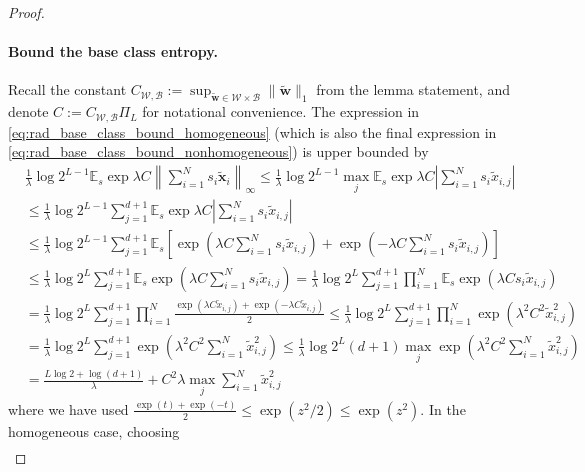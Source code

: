 \documentclass{article}
\def\vw{{\bm{w}}}
\def\vx{{\bm{x}}}
\def\cB{{\mathcal{B}}}
\def\cW{{\mathcal{W}}}
\def\bE{{\mathbb{E}}}
\begin{document}
\begin{appendices}
\begin{proof}
    \paragraph{Bound the base class entropy.} Recall the constant $C_{\cW, \cB} := \sup_{\widetilde{\vw} \in \cW \times \cB} \| \widetilde{\vw} \|_1$ from the lemma statement, and denote $C := C_{\cW,\cB}  \Pi_L$ for notational convenience. The expression in \eqref{eq:rad_base_class_bound_homogeneous} (which is also the final expression in \eqref{eq:rad_base_class_bound_nonhomogeneous}) is upper bounded by
    \begin{align}
        &\frac{1}{\lambda} \log 2^{L-1} \bE_s \exp \lambda C \left\| \sum_{i=1}^N s_i \widetilde{\vx}_i \right\|_\infty \leq \frac{1}{\lambda} \log 2^{L-1} \max_j \bE_s \exp \lambda C \left| \sum_{i=1}^N s_i \widetilde{x}_{i,j} \right| \\
        &\leq \frac{1}{\lambda} \log 2^{L-1} \sum_{j=1}^{d+1} \bE_s \exp \lambda C \left| \sum_{i=1}^N s_i \widetilde{x}_{i,j} \right| \\
        &\leq \frac{1}{\lambda} \log 2^{L-1} \sum_{j=1}^{d+1}  \bE_s \left[  \exp \left( \lambda C  \sum_{i=1}^N s_i \widetilde{x}_{i,j} \right) +   \exp \left( -\lambda C  \sum_{i=1}^N s_i \widetilde{x}_{i,j} \right) \right]   \\
        &\leq \frac{1}{\lambda} \log 2^L \sum_{j=1}^{d+1}  \bE_s  \exp \left( \lambda C  \sum_{i=1}^N s_i \widetilde{x}_{i,j} \right) = \frac{1}{\lambda} \log 2^L \sum_{j=1}^{d+1} \prod_{i=1}^N  \bE_s  \exp \left( \lambda C   s_i \widetilde{x}_{i,j} \right) \\
        &= \frac{1}{\lambda} \log 2^L \sum_{j=1}^{d+1} \prod_{i=1}^N  \frac{\exp(\lambda C \widetilde{x}_{i,j}) + \exp(-\lambda C \widetilde{x}_{i,j})}{2} \leq \frac{1}{\lambda} \log 2^L \sum_{j=1}^{d+1} \prod_{i=1}^N  \exp \left( \lambda^2 C^2 \widetilde{x}_{i,j}^2 \right) \\
        &= \frac{1}{\lambda} \log 2^L \sum_{j=1}^{d+1}  \exp \left( \lambda^2 C^2 \sum_{i=1}^N \widetilde{x}_{i,j}^2 \right) \leq \frac{1}{\lambda} \log 2^L (d+1) \max_j  \exp \left( \lambda^2 C^2 \sum_{i=1}^N \widetilde{x}_{i,j}^2 \right) \\
        &= \frac{L \log 2 + \log(d + 1)}{\lambda} + C^2 \lambda \max_j \sum_{i=1}^N \widetilde{x}_{i,j}^2 
    \end{align}
    where we have used $\frac{\exp(t) + \exp(-t)}{2} \leq \exp(z^2/2) \leq \exp(z^2)$. In the homogeneous case, choosing
    \begin{align}

\end{align}
\end{proof}
\end{appendices}
\end{document}
